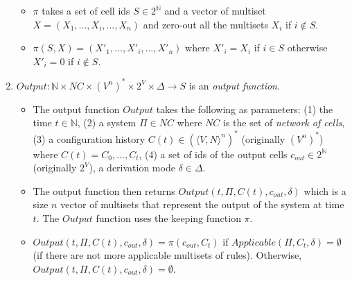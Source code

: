 \documentclass{article}
\newcommand{\ra}{\rightarrow}
\begin{document}
\begin{appendices}
\begin{enumerate}
         \begin{itemize} 
            \item $\pi$ takes a set of cell ids $S\in 2^{\mathbb{N}}$ and a vector of multiset 
                  $X = (X_1,...,X_i,...,X_n)$ and zero-out all the multisets $X_i$ if $i \not\in S$.
            \item $\pi(S,X) = (X'_1,...,X'_i,...,X'_n)$ where $X'_i = X_i$ if $i \in S$ otherwise 
                  $X'_i = 0$ if $i \not\in S$.
         \end{itemize}
   \item $Output: \mathbb{N} \times NC \times (V^n)^* \times 2^V \times \Delta \ra S$ is an 
         \emph{output function}. \label{a-ff3-out}
         \begin{itemize}
            \item The output function $Output$ takes the following as parameters: (1) the time $t 
                  \in \mathbb{N}$, (2) a system $\Pi \in NC$ where $NC$ is the set of \emph{network
                  of cells}, (3) a configuration history $C(t) \in (\langle V,N \rangle^n)^*$ 
                  (originally $(V^n)^*$) where $C(t) = C_0,...,C_t$, (4) a set of ids of the output
                  cells $c_{out} \in 2^{\mathbb{N}}$ (originally $2^V$), a derivation mode $\delta 
                  \in \Delta$.
            \item The output function then returns $Output(t, \Pi, C(t), c_{out}, \delta)$ which is
                  a size $n$ vector of multisets that represent the output of the system at time 
                  $t$. The $Output$ function uses the keeping function $\pi$.
            \item $Output(t, \Pi, C(t), c_{out}, \delta) = \pi(c_{out},C_t)$ if $Applicable(\Pi,
                  C_t, \delta) = \emptyset$ (if there are not more applicable multisets of rules).
                  Otherwise, $Output(t, \Pi, C(t), c_{out}, \delta) = \emptyset$.
         \end{itemize}
\end{enumerate}


\end{appendices}

\end{document}
